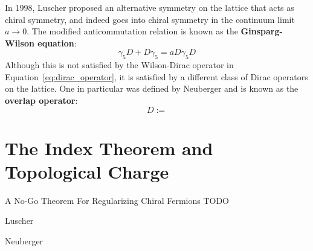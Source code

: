 \documentclass[11pt, oneside]{article}   	%
\theoremstyle{definition}
\begin{document}
In 1998, Luscher \cite{luscher} proposed an alternative symmetry on the lattice that acts as chiral symmetry, and indeed goes into chiral symmetry in the continuum 
limit $a\rightarrow 0$. The modified anticommutation relation is known as the \textbf{Ginsparg-Wilson equation}:
\begin{equation}
	\gamma_5 D + D\gamma_5 = aD\gamma_5 D
\end{equation}
Although this is not satisfied by the Wilson-Dirac operator in Equation~\ref{eq:dirac_operator}, it is satisfied by a different class of Dirac operators on the lattice. One in 
particular was defined by Neuberger \cite{neuberger} and is known as the \textbf{overlap operator}:
\begin{equation}
	D := 
\end{equation}

\section{The Index Theorem and Topological Charge}


\newpage
\begin{thebibliography}{99}

	A No-Go Theorem For Regularizing Chiral Fermions TODO
	
	Luscher
	
	Neuberger

\end{thebibliography}
\end{document}
